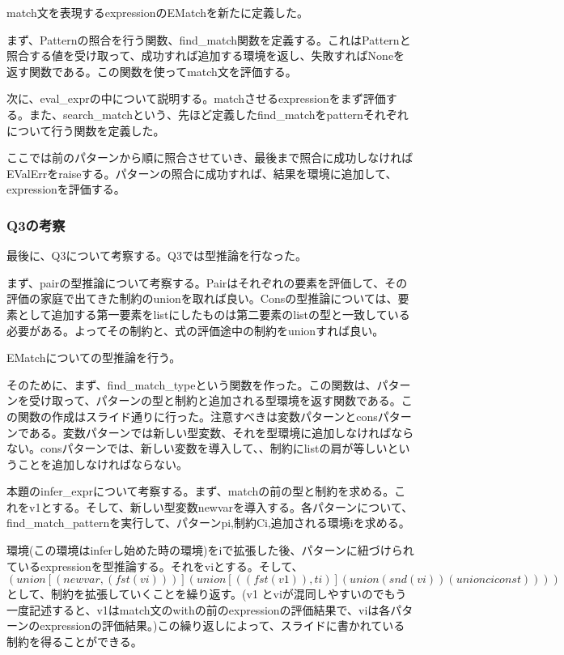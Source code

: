 \documentclass[uplatex,12pt]{jsarticle}
\begin{document}
match文を表現するexpressionのEMatchを新たに定義した。

まず、Patternの照合を行う関数、find\_match関数を定義する。これはPatternと照合する値を受け取って、成功すれば追加する環境を返し、失敗すればNoneを返す関数である。この関数を使ってmatch文を評価する。

次に、eval\_exprの中について説明する。matchさせるexpressionをまず評価する。また、search\_matchという、先ほど定義したfind\_matchをpatternそれぞれについて行う関数を定義した。

ここでは前のパターンから順に照合させていき、最後まで照合に成功しなければEValErrをraiseする。パターンの照合に成功すれば、結果を環境に追加して、expressionを評価する。

\subsubsection{Q3の考察}
最後に、Q3について考察する。Q3では型推論を行なった。

まず、pairの型推論について考察する。Pairはそれぞれの要素を評価して、その評価の家庭で出てきた制約のunionを取れば良い。Consの型推論については、要素として追加する第一要素をlistにしたものは第二要素のlistの型と一致している必要がある。よってその制約と、式の評価途中の制約をunionすれば良い。

EMatchについての型推論を行う。

そのために、まず、find\_match\_typeという関数を作った。この関数は、パターンを受け取って、パターンの型と制約と追加される型環境を返す関数である。この関数の作成はスライド通りに行った。注意すべきは変数パターンとconsパターンである。変数パターンでは新しい型変数、それを型環境に追加しなければならない。consパターンでは、新しい変数を導入して、、制約にlistの肩が等しいということを追加しなければならない。

本題のinfer\_exprについて考察する。まず、matchの前の型と制約を求める。これをv1とする。そして、新しい型変数newvarを導入する。各パターンについて、find\_match\_patternを実行して、パターンpi,制約Ci,追加される環境\Gamma iを求める。

環境(この環境はinferし始めた時の環境)を\Gamma iで拡張した後、パターンに紐づけられているexpressionを型推論する。それをviとする。そして、$(union [(newvar, (fst(vi)))] (union [((fst(v1)), ti)](union (snd(vi)) (union ci const))))$として、制約を拡張していくことを繰り返す。(v1 とviが混同しやすいのでもう一度記述すると、v1はmatch文のwithの前のexpressionの評価結果で、viは各パターンのexpressionの評価結果。)この繰り返しによって、スライドに書かれている制約を得ることができる。
\end{document}
